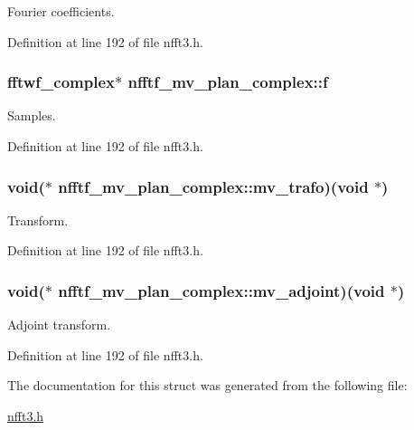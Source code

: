 Fourier coefficients. 



Definition at line 192 of file nfft3.\-h.

\hypertarget{structnfftf__mv__plan__complex_ab3a2f060f60eb88cd268bc1bec2e5310}{
\subsubsection[{f}]{\setlength{\rightskip}{0pt plus 5cm}fftwf\-\_\-complex$\ast$ nfftf\-\_\-mv\-\_\-plan\-\_\-complex\-::f}}\label{structnfftf__mv__plan__complex_ab3a2f060f60eb88cd268bc1bec2e5310}


Samples. 



Definition at line 192 of file nfft3.\-h.

\hypertarget{structnfftf__mv__plan__complex_a48e28caf604132d02999d1dc0f5dc9a0}{
\subsubsection[{mv\-\_\-trafo}]{\setlength{\rightskip}{0pt plus 5cm}void($\ast$ nfftf\-\_\-mv\-\_\-plan\-\_\-complex\-::mv\-\_\-trafo)(void $\ast$)}}\label{structnfftf__mv__plan__complex_a48e28caf604132d02999d1dc0f5dc9a0}


Transform. 



Definition at line 192 of file nfft3.\-h.

\hypertarget{structnfftf__mv__plan__complex_acbff2532fc4d66cf92321be33ef6498f}{
\subsubsection[{mv\-\_\-adjoint}]{\setlength{\rightskip}{0pt plus 5cm}void($\ast$ nfftf\-\_\-mv\-\_\-plan\-\_\-complex\-::mv\-\_\-adjoint)(void $\ast$)}}\label{structnfftf__mv__plan__complex_acbff2532fc4d66cf92321be33ef6498f}


Adjoint transform. 



Definition at line 192 of file nfft3.\-h.



The documentation for this struct was generated from the following file\-:\begin{DoxyCompactItemize}
\item 
\hyperlink{nfft3_8h}{nfft3.\-h}\end{DoxyCompactItemize}
